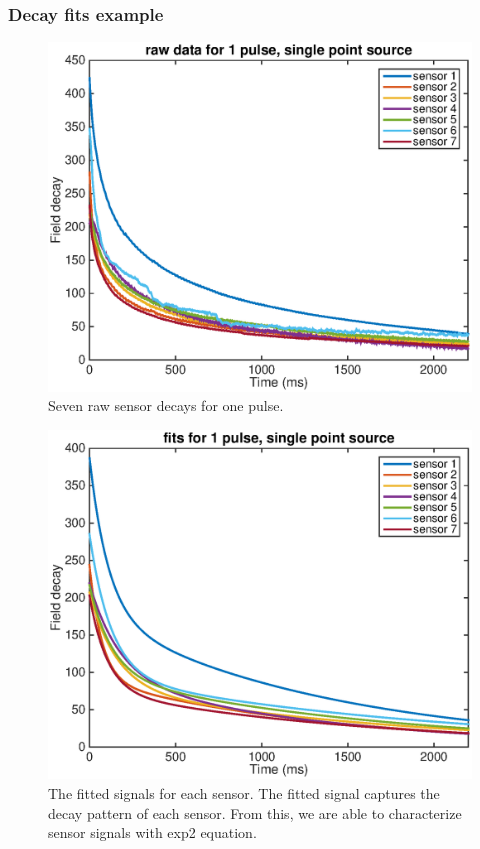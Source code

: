 \documentclass[a4paper]{article}
\begin{document}
\subsubsection*{Decay fits example}

\begin{figure}[H]
\centering
\includegraphics[width=1\textwidth]{raw_data.eps}
\caption{Seven raw sensor decays for one pulse.}
\label{Figure 2}
\end{figure}

\begin{figure}[H]
\centering
\includegraphics[width=1\textwidth]{fitted_data.eps}
\caption{The fitted signals for each sensor. The fitted signal captures the decay pattern of each sensor. From this, we are able to characterize sensor signals with exp2 equation.}
\label{Figure 3}
\end{figure}
\end{document}
